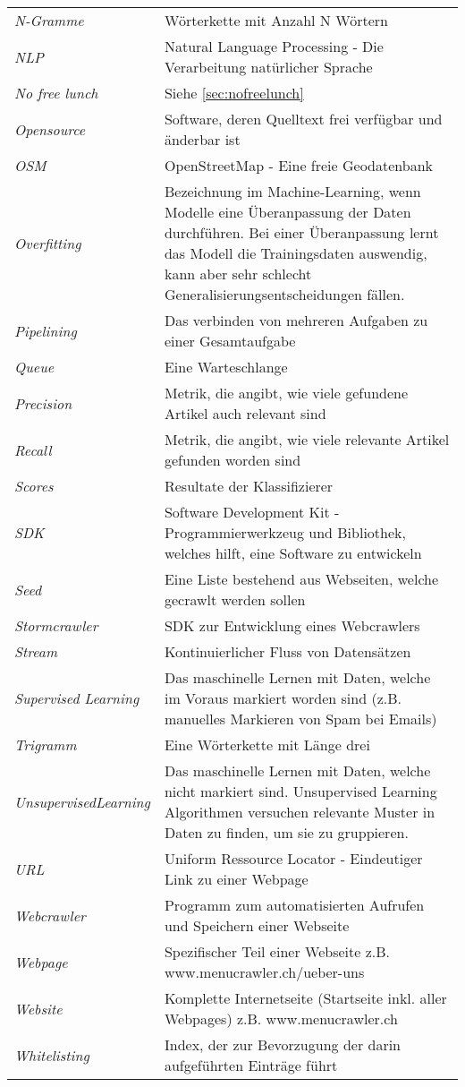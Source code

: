 \begin{table}[H]
	\begin{tabular}{>{\em}p{4cm}p{12cm}}
		N-Gramme & Wörterkette mit Anzahl N Wörtern\\
		NLP & Natural Language Processing - Die Verarbeitung natürlicher Sprache\\
		No free lunch & Siehe \cref{sec:nofreelunch}\\
		Opensource & Software, deren Quelltext frei verfügbar und änderbar ist\\
		OSM & OpenStreetMap - Eine freie Geodatenbank\\
		Overfitting & Bezeichnung im Machine-Learning, wenn Modelle eine Überanpassung der Daten durchführen. Bei einer Überanpassung lernt das Modell die Trainingsdaten auswendig, kann aber sehr schlecht Generalisierungsentscheidungen fällen.\\
		Pipelining & Das verbinden von mehreren Aufgaben zu einer Gesamtaufgabe\\
		Queue & Eine Warteschlange\\
		Precision & Metrik, die angibt, wie viele gefundene Artikel auch relevant sind\\
		Recall & Metrik, die angibt, wie viele relevante Artikel gefunden worden sind\\
		Scores & Resultate der Klassifizierer\\
		SDK & Software Development Kit - Programmierwerkzeug und Bibliothek, welches hilft, eine Software zu entwickeln\\
		Seed & Eine Liste bestehend aus Webseiten, welche gecrawlt werden sollen\\
		Stormcrawler & SDK zur Entwicklung eines Webcrawlers\\
		Stream & Kontinuierlicher Fluss von Datensätzen\\
		Supervised Learning & Das maschinelle Lernen mit Daten, welche im Voraus markiert worden sind (z.B. manuelles Markieren von Spam bei Emails)\\
		Trigramm & Eine Wörterkette mit Länge drei\\
		Unsupervised\newline Learning & Das maschinelle Lernen mit Daten, welche nicht markiert sind. Unsupervised Learning Algorithmen versuchen relevante Muster in Daten zu finden, um sie zu gruppieren.\\
		URL & Uniform Ressource Locator - Eindeutiger Link zu einer Webpage\\
		Webcrawler & Programm zum automatisierten Aufrufen und Speichern einer Webseite\\
		Webpage & Spezifischer Teil einer Webseite z.B. www.menucrawler.ch/ueber-uns\\
		Website & Komplette Internetseite (Startseite inkl. aller Webpages) z.B. www.menucrawler.ch\\
		Whitelisting & Index, der zur Bevorzugung der darin aufgeführten Einträge führt\\	
	\end{tabular}
\end{table}
